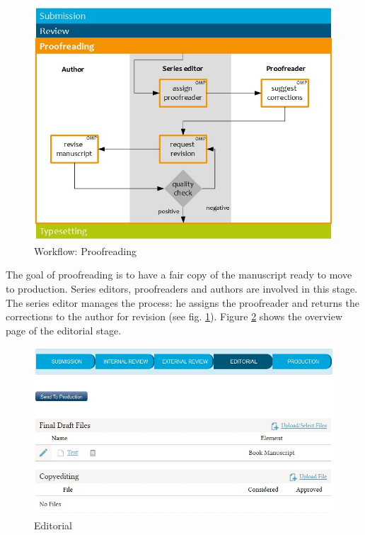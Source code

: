 \begin{figure}[h] \centering
\includegraphics[width=1\textwidth]{./img/workflow_proofreading.jpg} \caption{Workflow: Proofreading}
\label{fig:workflowProofreading}
\end{figure}

The goal of proofreading is to have a fair copy of the manuscript ready to move to production. Series editors, proofreaders and authors are involved in this stage. The series editor manages the process: he assigns the proofreader and returns the corrections to the author for revision (see fig. \ref{fig:workflowProofreading}). Figure \ref{fig:editorial} shows the overview page of the editorial stage. 

\begin{figure}[h] \centering
\includegraphics[width=1\textwidth]{./img/editorial.jpg} \caption{Editorial}
\label{fig:editorial}
\end{figure}

